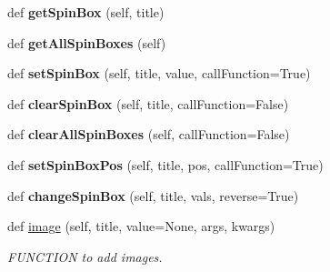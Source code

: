 \begin{DoxyCompactItemize}
\item 
\mbox{\label{class_python_01_g_u_i_1_1appjar_1_1gui_a5887e40a89ee54117f2f5ec46f187cb0}} 
def {\bfseries get\+Spin\+Box} (self, title)
\item 
\mbox{\label{class_python_01_g_u_i_1_1appjar_1_1gui_a2616cfc3bae8461f1583fc0b6633c2bd}} 
def {\bfseries get\+All\+Spin\+Boxes} (self)
\item 
\mbox{\label{class_python_01_g_u_i_1_1appjar_1_1gui_a10e0d49caa0c080c9d7670b493e506ca}} 
def {\bfseries set\+Spin\+Box} (self, title, value, call\+Function=True)
\item 
\mbox{\label{class_python_01_g_u_i_1_1appjar_1_1gui_a3181a4ad2af696d2872f7f73205802ff}} 
def {\bfseries clear\+Spin\+Box} (self, title, call\+Function=False)
\item 
\mbox{\label{class_python_01_g_u_i_1_1appjar_1_1gui_aefe1d1ab7a2e8ecf0f84f843406d7726}} 
def {\bfseries clear\+All\+Spin\+Boxes} (self, call\+Function=False)
\item 
\mbox{\label{class_python_01_g_u_i_1_1appjar_1_1gui_ac6bf96298503302e869751bd2bc0632d}} 
def {\bfseries set\+Spin\+Box\+Pos} (self, title, pos, call\+Function=True)
\item 
\mbox{\label{class_python_01_g_u_i_1_1appjar_1_1gui_a6099d4740f987d69f34d3eca9101e648}} 
def {\bfseries change\+Spin\+Box} (self, title, vals, reverse=True)
\item 
def \hyperlink{class_python_01_g_u_i_1_1appjar_1_1gui_a17243935a5285eba9b2b6b0eb3e9d86a}{image} (self, title, value=None, args, kwargs)
\begin{DoxyCompactList}\small\item\em F\+U\+N\+C\+T\+I\+ON to add images. \end{DoxyCompactList}\item 
\mbox{\label{class_python_01_g_u_i_1_1appjar_1_1gui_ace522ca3223282f2d5c2343224c70ffc}} 

\end{DoxyCompactItemize}
